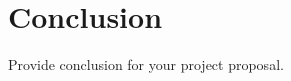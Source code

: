 \documentclass[12pt, a4paper]{report}
\begin{document}


\chapter{Conclusion} %
\label{cha:conclusion}
Provide conclusion for your project proposal.

\printbibliography[title={References}]
\end{document}
